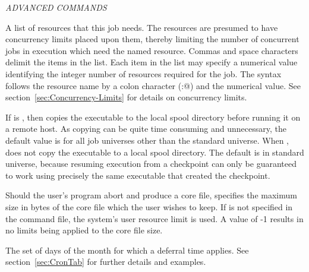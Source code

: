 \emph{ADVANCED COMMANDS}
\begin{description} 

\label{condor-submit-concurrency-limits}
\item[concurrency\_limits = $<$string-list$>$]
A list of resources that this job needs.
The resources are presumed to have concurrency limits placed upon them,
thereby limiting the number of concurrent jobs in execution which
need the named resource.
Commas and space characters delimit the items in the list.
Each item in the list may specify a numerical value identifying the integer
number of resources required for the job.
The syntax follows the resource name by a colon character (\verb@:@)
and the numerical value.
See section~\ref{sec:Concurrency-Limits} for details on concurrency limits.


\label{condor-submit-copy-to-spool}
\item[copy\_to\_spool = $<$True \Bar\ False$>$]
If  is ,
then  copies the executable to the local spool 
directory before running it on a remote host. 
As copying can be quite time consuming and unnecessary,
the default value is  for all job universes
other than the standard universe. 
When ,  does not copy the executable
to a local spool directory.
The default is  in standard universe, because
resuming execution from a checkpoint can only be guaranteed to work using
precisely the same executable that created the checkpoint.


\label{condor-submit-coresize}
\item[coresize = $<$size$>$] Should the user's program abort and produce
a core file,  specifies the maximum size in bytes of the
core file which the user wishes to keep. If  is not
specified in the command file, the system's user resource limit
 is used.
A value of -1 results in no limits being applied to the core file size.

\label{condor-submit-cron-day-of-month}
\item[cron\_day\_of\_month = $<$Cron-evaluated Day$>$]
The set of days of the month for which a deferral time applies.
See section~\ref{sec:CronTab} for further details and examples.


\end{description}

